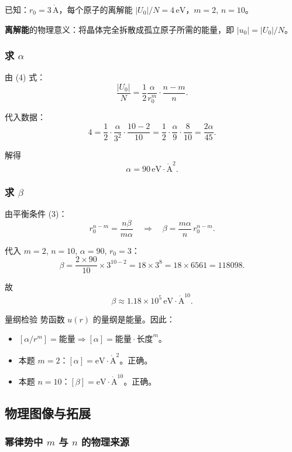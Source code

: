 已知：$r_0 = 3\,\mathring{\mathrm{A}}$，每个原子的离解能 $|U_0|/N = 4\,\text{eV}$，$m=2$, $n=10$。

\textbf{离解能}的物理意义：将晶体完全拆散成孤立原子所需的能量，即 $|u_0| = |U_0|/N$。

\subsubsection{求 $\alpha$}

由 (4) 式：
\[
  \frac{|U_0|}{N} = \frac{1}{2}\frac{\alpha}{r_0^m}\cdot\frac{n-m}{n}.
\]

代入数据：
\[
  4 = \frac{1}{2}\cdot\frac{\alpha}{3^2}\cdot\frac{10-2}{10}
  = \frac{1}{2}\cdot\frac{\alpha}{9}\cdot\frac{8}{10}
  = \frac{2\alpha}{45}.
\]

解得
\[
  \boxed{ \alpha = 90\,\mathrm{eV}\cdot\mathring{\mathrm{A}}^2 }.
\]

\subsubsection{求 $\beta$}

由平衡条件 (3)：
\[
  r_0^{n-m} = \frac{n\beta}{m\alpha}
  \quad\Longrightarrow\quad
  \beta = \frac{m\alpha}{n}\,r_0^{n-m}.
\]

代入 $m=2$, $n=10$, $\alpha=90$, $r_0=3$：
\[
  \beta = \frac{2\times 90}{10}\times 3^{10-2}
       = 18\times 3^8
       = 18\times 6561
       = 118098.
\]

故
\[
  \boxed{ \beta \approx 1.18\times 10^5\,\mathrm{eV}\cdot\mathring{\mathrm{A}}^{10} }.
\]

\begin{tipbox}{量纲检验}
势函数 $u(r)$ 的量纲是能量。因此：
\begin{itemize}[nosep]
  \item $[\alpha/r^m] = \text{能量} \Rightarrow [\alpha] = \text{能量}\cdot\text{长度}^m$。
  \item 本题 $m=2$：$[\alpha] = \mathrm{eV}\cdot\mathring{\mathrm{A}}^2$。正确。
  \item 本题 $n=10$：$[\beta] = \mathrm{eV}\cdot\mathring{\mathrm{A}}^{10}$。正确。
\end{itemize}
\end{tipbox}

\subsection{物理图像与拓展}

\subsubsection{幂律势中 $m$ 与 $n$ 的物理来源}

